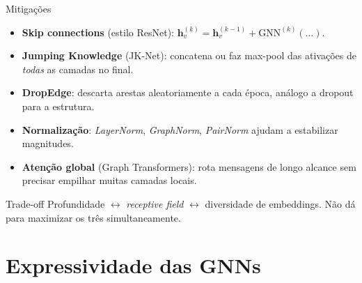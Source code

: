 \documentclass[aspectratio=169,xcolor=dvipsnames]{beamer}
\begin{document}
  \begin{frame}{Mitigações}
    \begin{itemize}
      \item \textbf{Skip connections} (estilo ResNet): $\mathbf{h}^{(k)}_v = \mathbf{h}^{(k-1)}_v +
            \mathrm{GNN}^{(k)}(\ldots)$.
      \item \textbf{Jumping Knowledge} (JK-Net): concatena ou faz max-pool das
            ativações de \textit{todas} as camadas no final.
      \item \textbf{DropEdge}: descarta arestas aleatoriamente a cada época,
            análogo a dropout para a estrutura.
      \item \textbf{Normalização}: \textit{LayerNorm}, \textit{GraphNorm},
            \textit{PairNorm} ajudam a estabilizar magnitudes.
      \item \textbf{Atenção global} (Graph Transformers): rota mensagens
            de longo alcance sem precisar empilhar muitas camadas locais.
    \end{itemize}

    \vspace{0.4em}
    \begin{alertblock}{Trade-off}
      Profundidade $\leftrightarrow$ \textit{receptive field} $\leftrightarrow$
      diversidade de embeddings. Não dá para maximizar os três simultaneamente.
    \end{alertblock}
  \end{frame}

  \section{Expressividade das GNNs}
\end{document}
